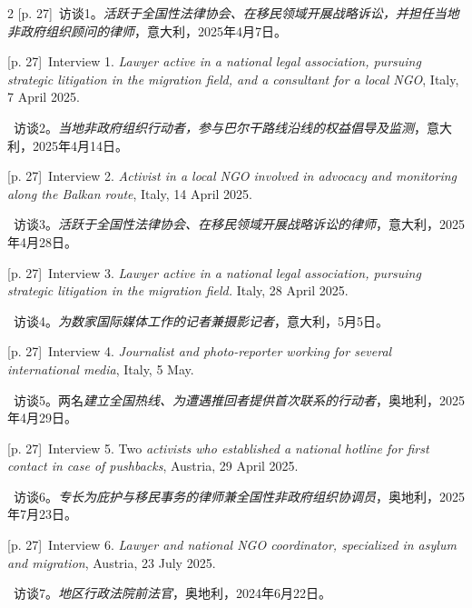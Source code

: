 \documentclass[10pt,a4paper]{article}
\begin{document}
\begin{paracol}{2}
{\scriptsize\color{gray} [p. 27]}\ 访谈1。\textit{活跃于全国性法律协会、在移民领域开展战略诉讼，并担任当地非政府组织顾问的律师}，意大利，2025年4月7日。\par
\switchcolumn
{\scriptsize\color{gray} [p. 27]}\ Interview 1. \textit{Lawyer active in a national legal association, pursuing strategic litigation in the migration field, and a consultant for a local NGO}, Italy, 7 April 2025.\par
\switchcolumn*
{\scriptsize\color{gray} [p. 27]}\ 访谈2。\textit{当地非政府组织行动者，参与巴尔干路线沿线的权益倡导及监测}，意大利，2025年4月14日。\par
\switchcolumn
{\scriptsize\color{gray} [p. 27]}\ Interview 2. \textit{Activist in a local NGO involved in advocacy and monitoring along the Balkan route}, Italy, 14 April 2025.\par
\switchcolumn*
{\scriptsize\color{gray} [p. 27]}\ 访谈3。\textit{活跃于全国性法律协会、在移民领域开展战略诉讼的律师}，意大利，2025年4月28日。\par
\switchcolumn
{\scriptsize\color{gray} [p. 27]}\ Interview 3. \textit{Lawyer active in a national legal association, pursuing strategic litigation in the migration field.} Italy, 28 April 2025.\par
\switchcolumn*
{\scriptsize\color{gray} [p. 27]}\ 访谈4。\textit{为数家国际媒体工作的记者兼摄影记者}，意大利，5月5日。\par
\switchcolumn
{\scriptsize\color{gray} [p. 27]}\ Interview 4. \textit{Journalist and photo-reporter working for several international media}, Italy, 5 May.\par
\switchcolumn*
{\scriptsize\color{gray} [p. 27]}\ 访谈5。两名\textit{建立全国热线、为遭遇推回者提供首次联系的行动者}，奥地利，2025年4月29日。\par
\switchcolumn
{\scriptsize\color{gray} [p. 27]}\ Interview 5. Two \textit{activists who established a national hotline for first contact in case of pushbacks}, Austria, 29 April 2025.\par
\switchcolumn*
{\scriptsize\color{gray} [p. 27]}\ 访谈6。\textit{专长为庇护与移民事务的律师兼全国性非政府组织协调员}，奥地利，2025年7月23日。\par
\switchcolumn
{\scriptsize\color{gray} [p. 27]}\ Interview 6. \textit{Lawyer and national NGO coordinator, specialized in asylum and migration}, Austria, 23 July 2025.\par
\switchcolumn*
{\scriptsize\color{gray} [p. 27]}\ 访谈7。\textit{地区行政法院前法官}，奥地利，2024年6月22日。\par

\end{paracol}
\end{document}
